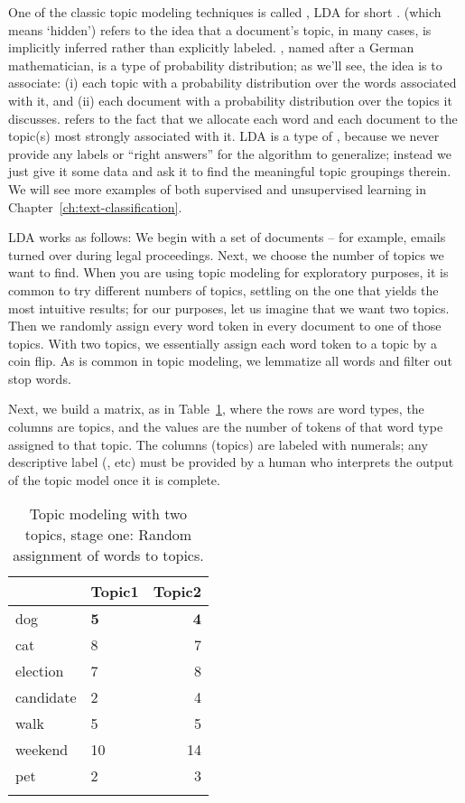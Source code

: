 One of the classic topic modeling techniques is called , LDA for short \citep{Blei-etal:2003}.   (which means
`hidden') refers to the idea that a document's topic, in many cases,
is implicitly inferred rather than explicitly labeled.
, named after a German mathematician, is a type of
probability distribution; as we'll see, the idea is to associate: (i)
each topic with a probability distribution over the words associated
with it, and (ii) each document with a probability distribution over
the topics it discusses.   refers to the fact that
we allocate each word and each document to the topic(s) most strongly
associated with it.  LDA is a type of
, because we never provide any labels
or ``right answers'' for the algorithm to generalize; instead we just
give it some data and ask it to find the meaningful topic groupings
therein. We will see more examples of both supervised and  unsupervised learning in
Chapter~\ref{ch:text-classification}.

LDA works as follows: We begin with a set of documents -- for example,
emails turned over during legal proceedings.  Next, we choose the
number of topics we want to find. When you are using topic modeling
for exploratory purposes, it is common to try different numbers of
topics, settling on the one that yields the most intuitive results;
for our purposes, let us imagine that we want two topics. Then we
randomly assign every word token in every document to one of those
topics.  With two topics, we essentially assign each word token to a
topic by a coin flip.  As is common in topic modeling, we lemmatize
all words and filter out stop words.

Next, we build a matrix, as in Table~\ref{tab:topic-modeling1}, where
the rows are word types, the columns are topics, and the values are
the number of tokens of that word type assigned to that topic.  The
columns (topics) are labeled with numerals; any descriptive label
(, etc) must be provided by a human who
interprets the output of the topic model once it is complete.

\begin{table}
\begin{tabular}{llr}
\lsptoprule
& Topic1 & Topic2 \\ \midrule
dog & \textbf{5} & \textbf{4} \\
cat & 8 & 7 \\ 
election & 7  & 8 \\ 
candidate & 2 & 4  \\
walk & 5 & 5 \\ 
weekend & 10 & 14 \\ 
pet & 2 & 3 \\ 
\lspbottomrule
\end{tabular}
\caption{Topic modeling with two topics, stage one: Random assignment of words to topics.}
\label{tab:topic-modeling1}
\end{table}



